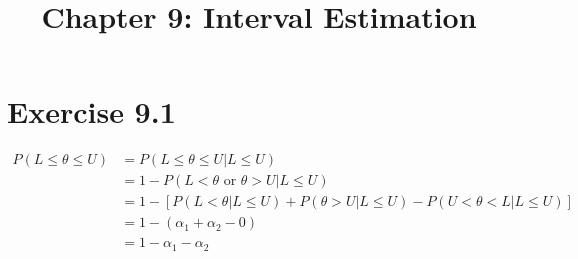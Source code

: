 \documentclass[12pt]{article}
\title{Chapter 9: Interval Estimation}
\begin{document}
	\maketitle
	
\section*{Exercise 9.1}
\begin{align*}
	P(L \leq \theta \leq U) &= P(L \leq \theta \leq U | L \leq U) \\
	 &= 1 - P(L < \theta \text{ or } \theta > U | L \leq U) \\
	 &= 1 - \left[P(L < \theta| L \leq U) + P( \theta > U | L \leq U) - P(U < \theta < L | L \leq U)\right] \\
	 &= 1 - (\alpha_1 + \alpha_2 - 0) \\
	 &=  1 - \alpha_1 - \alpha_2
\end{align*}
\end{document}
